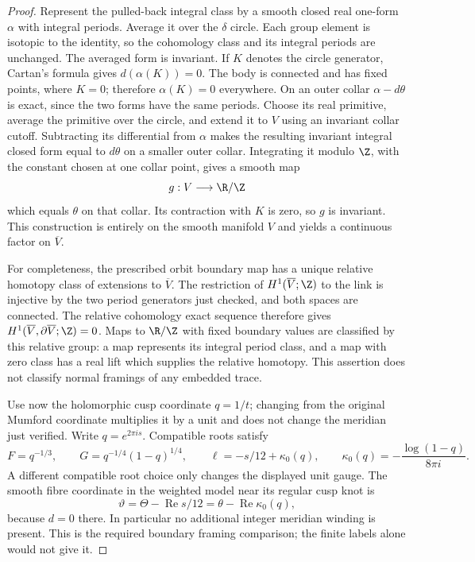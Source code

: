 \begin{proof}
Represent the pulled-back integral class by a smooth closed real
one-form $\alpha$ with integral periods. Average it over the
$\delta$ circle. Each group element is isotopic to the identity,
so the cohomology class and its integral periods are unchanged.
The averaged form is invariant. If $K$ denotes the circle
generator, Cartan's formula gives $d(\alpha(K))=0$.
The body is connected and has fixed points, where $K=0$;
therefore $\alpha(K)=0$ everywhere.
On an outer collar $\alpha-d\theta$ is exact, since the two
forms have the same periods. Choose its real primitive,
average the primitive over the circle, and extend it to $V$
using an invariant collar cutoff. Subtracting its differential
from $\alpha$ makes the resulting invariant integral closed
form equal to $d\theta$ on a smaller outer collar. Integrating
it modulo $\Z$, with the constant chosen at one collar point,
gives a smooth map
\[
 g:V\longrightarrow\R/\Z
\]
which equals $\theta$ on that collar. Its contraction with $K$
is zero, so $g$ is invariant. This construction is entirely on
the smooth manifold $V$ and yields a continuous factor on
$\overline V$.

For completeness, the prescribed orbit boundary map has a
unique relative homotopy class of extensions to $\overline V$.
The restriction of $H^1(\overline V;\Z)$ to the link is
injective by the two period generators just checked, and both
spaces are connected. The relative cohomology exact sequence
therefore gives $H^1(\overline V,\partial\overline V;\Z)=0$.
Maps to $\R/\Z$ with fixed boundary values are classified by
this relative group: a map represents its integral period class,
and a map with zero class has a real lift which supplies the
relative homotopy. This assertion does not classify normal
framings of any embedded trace.

Use now the holomorphic cusp coordinate $q=1/t$; changing from
the original Mumford coordinate multiplies it by a unit and
does not change the meridian just verified. Write
$q=e^{2\pi i s}$. Compatible roots satisfy
\[
 F=q^{-1/3},\qquad G=q^{-1/4}(1-q)^{1/4},\qquad
 \ell=-s/12+\kappa_0(q),\qquad
 \kappa_0(q)=-\frac{\log(1-q)}{8\pi i}.
\]
A different compatible root choice only changes the displayed
unit gauge. The smooth fibre coordinate in the weighted model
near its regular cusp knot is
\begin{equation}\label{push:eq:C13-cusp-gauge}
 \vartheta=\Theta-\operatorname{Re}s/12
           =\theta-\operatorname{Re}\kappa_0(q),
\end{equation}
because $d=0$ there. In particular no additional integer
meridian winding is present. This is the required boundary
framing comparison; the finite labels alone would not give it.


\end{proof}
